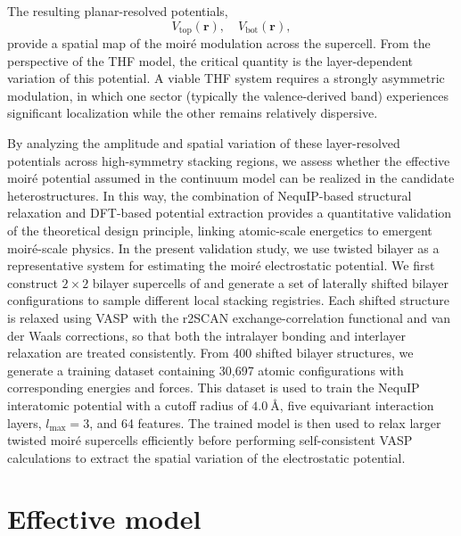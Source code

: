 \documentclass[aps, preprint, prb,]{revtex4-2}
\begin{document}
The resulting planar-resolved potentials,
\begin{equation}
V_{\mathrm{top}}(\mathbf{r}), \quad V_{\mathrm{bot}}(\mathbf{r}),
\end{equation}
provide a spatial map of the moir\'e modulation across the supercell. From the perspective of the THF model, the critical quantity is the layer-dependent variation of this potential. A viable THF system requires a strongly asymmetric modulation, in which one sector (typically the valence-derived band) experiences significant localization while the other remains relatively dispersive.

By analyzing the amplitude and spatial variation of these layer-resolved potentials across high-symmetry stacking regions, we assess whether the effective moir\'e potential assumed in the continuum model can be realized in the candidate heterostructures. In this way, the combination of NequIP-based structural relaxation and DFT-based potential extraction provides a quantitative validation of the theoretical design principle, linking atomic-scale energetics to emergent moir\'e-scale physics.
In the present validation study, we use twisted bilayer  as a representative system for estimating the moir\'e electrostatic potential. We first construct \(2\times2\) bilayer supercells of  and generate a set of laterally shifted bilayer configurations to sample different local stacking registries. Each shifted structure is relaxed using VASP with the r2SCAN exchange-correlation functional and van der Waals corrections, so that both the intralayer bonding and interlayer relaxation are treated consistently. From 400 shifted bilayer structures, we generate a training dataset containing 30,697 atomic configurations with corresponding energies and forces. This dataset is used to train the NequIP interatomic potential with a cutoff radius of \(4.0~\text{\AA}\), five equivariant interaction layers, \(l_{\max}=3\), and 64 features. The trained model is then used to relax larger twisted  moir\'e supercells efficiently before performing self-consistent VASP calculations to extract the spatial variation of the electrostatic potential.
\section{Effective model}
\end{document}
